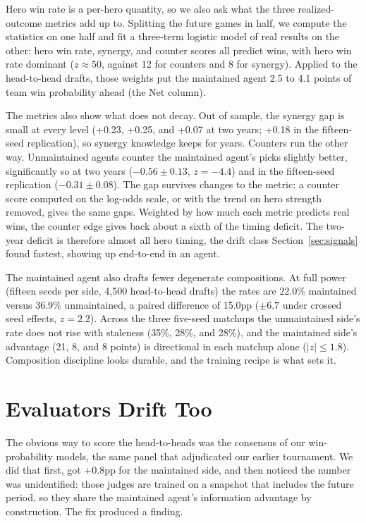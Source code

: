 \documentclass[journal]{IEEEtran}
\begin{document}
Hero win rate is a per-hero quantity, so we also ask what the three
realized-outcome metrics add up to. Splitting the future games in half,
we compute the statistics on one half and fit a three-term logistic
model of real results on the other: hero win rate, synergy, and counter
scores all predict wins, with hero win rate dominant ($z \approx 50$,
against 12 for counters and 8 for synergy). Applied to the head-to-head
drafts, those weights put the maintained agent 2.5 to 4.1 points of
team win probability ahead (the Net column).

The metrics also show what does not decay. Out of sample, the synergy
gap is small at every level (+0.23, +0.25, and +0.07 at two years;
+0.18 in the fifteen-seed replication), so synergy knowledge keeps for
years. Counters run
the other way. Unmaintained agents counter the maintained agent's picks
slightly better, significantly so at two years ($-0.56 \pm 0.13$,
$z = -4.4$) and in the fifteen-seed replication ($-0.31 \pm 0.08$). The
gap survives changes to the metric: a counter score computed on the
log-odds scale, or with the trend on hero strength removed, gives the
same gaps. Weighted by how much each metric predicts real wins, the
counter edge gives back about a sixth of the timing deficit. The
two-year deficit is therefore almost all hero timing, the drift class
Section~\ref{sec:signals} found fastest, showing up end-to-end in an
agent.

The maintained agent also drafts fewer degenerate compositions. At full
power (fifteen seeds per side, 4{,}500 head-to-head drafts) the rates
are 22.0\% maintained versus 36.9\% unmaintained, a paired difference
of 15.0pp ($\pm 6.7$ under crossed seed effects, $z = 2.2$). Across the
three five-seed matchups the unmaintained side's rate does not rise
with staleness (35\%, 28\%, and 28\%), and the maintained side's
advantage (21, 8, and 8 points) is directional in each matchup alone
($|z| \leq 1.8$). Composition discipline looks durable, and the training
recipe is what sets it.

\section{Evaluators Drift Too}
\label{sec:vintage}

The obvious way to score the head-to-heads was the consensus of our
win-probability models, the same panel that adjudicated our earlier
tournament. We did that first, got +0.8pp for the maintained side, and
then noticed the number was unidentified: those judges are trained on a
snapshot that includes the future period, so they share the maintained
agent's information advantage by construction. The fix produced a
finding.
\end{document}
